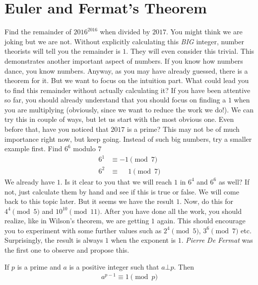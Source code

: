 \section{Euler and Fermat's Theorem}
Find the remainder of $2016^{2016}$ when divided by $2017$. You might think we are joking but we are not. Without explicitly calculating this \textit{BIG} integer, number theorists will tell you the remainder is $1$. They will even consider this trivial. This demonstrates another important aspect of numbers. If you know how numbers dance, you know numbers. Anyway, as you may have already guessed, there is a theorem for it. But we want to focus on the intuition part. What could lead you to find this remainder without actually calculating it? If you have been attentive so far, you should already understand that you should focus on finding a $1$ when you are multiplying (obviously, since we want to reduce the work we do!). We can try this in couple of ways, but let us start with the most obvious one. Even before that, have you noticed that $2017$ is a prime? This may not be of much importance right now, but keep going. Instead of such big numbers, try a smaller example first. Find $6^6$ modulo $7$
	\begin{align*}
		6^1 & \equiv -1\pmod7\\
		6^2 & \equiv \phantom{-}1\pmod7
	\end{align*}
We already have $1$. Is it clear to you that we will reach $1$ in $6^4$ and $6^6$ as well? If not, just calculate them by hand and see if this is true or false. We will come back to this topic later. But it seems we have the result $1$. Now, do this for $4^4\pmod5$ and $10^{10}\pmod{11}$. After you have done all the work, you should realize, like in Wilson's theorem, we are getting $1$ again. This should encourage you to experiment with some further values such as $2^4\pmod5$, $3^6\pmod7$ etc. Surprisingly, the result is always $1$ when the exponent is $1$. \textit{Pierre De Fermat} was the first one to observe and propose this.
	\begin{theorem}
		If $p$ is a prime and $a$ is a positive integer such that $a \bot p$. Then
		\begin{align*}
			a^{p-1} \equiv 1 \pmod p
		\end{align*}
	\end{theorem}
